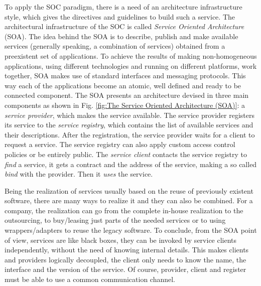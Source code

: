 To apply the SOC paradigm, there is a need of an architecture infrastructure style, which gives the directives and guidelines to build such a service.  
The architectural infrastructure of the SOC is called \textit{Service Oriented Architecture} (SOA). 
The idea behind the SOA is to describe, publish and make available services (generally speaking, a combination of services) obtained from a preexistent set of applications. 
To achieve the results of making non-homogeneous applications, using different technologies and running on different platforms, work together, SOA makes use of standard interfaces and messaging protocols. This way each of the applications become an atomic, well defined and ready to be connected component. 
The SOA presents an architecture devised in three main components \cite{Pernici04} as shown in Fig. \ref{fig:The Service Oriented Architecture (SOA)}:
a \textit{service provider}, which makes the service available. The service provider registers its service to the \textit{service registry}, which contains the list of available services and their descriptions. After the registration, the service provider waits for a client to request a service. The service registry can also apply custom access control policies or be entirely public. 
The \textit{service client} contacts the service registry to \textit{find} a service, it gets a contract and the address of the service, making a so called \textit{bind} with the provider. Then it \textit{uses} the service.


Being the realization of services usually based on the reuse of previously existent software, there are many ways to realize it and they can also be combined. For a company, the realization can go from the complete in-house realization to the outsourcing, to buy/leasing just parts of the needed services or to using wrappers/adapters to reuse the legacy software.
To conclude, from the SOA point of view, services are like black boxes, they can be invoked by service clients independently, without the need of knowing internal details. This makes clients and providers logically decoupled, the client only needs to know the name, the interface and the version of the service. Of course, provider, client and register must be able to use a common communication channel. 

